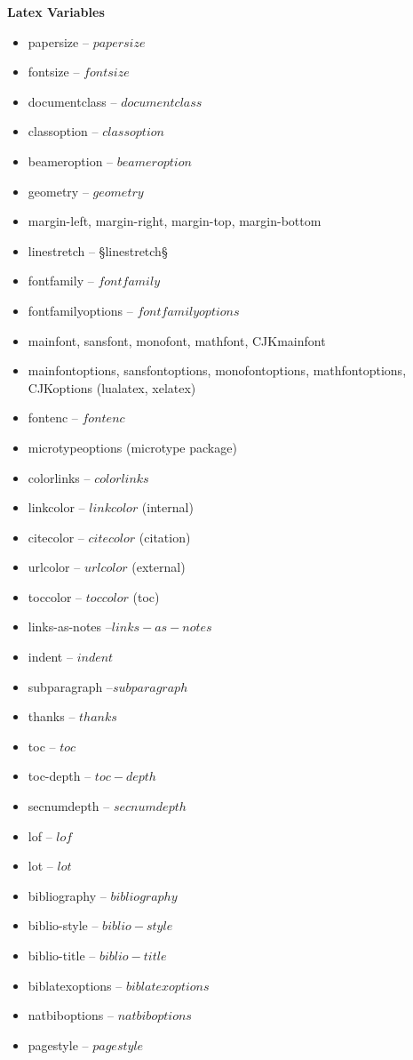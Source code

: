 \documentclass[$if(fontsize)$$fontsize$,$endif$$if(lang)$$babel-lang$,$endif$$if(papersize)$$papersize$paper,$endif$$for(classoption)$$classoption$$sep$,$endfor$]{$documentclass$}
\begin{document}
\textbf{Latex Variables}
\begin{itemize}
        \item papersize -- $papersize$
        \item fontsize -- $fontsize$
        \item documentclass -- $documentclass$
        \item classoption -- $classoption$
        \item beameroption -- $beameroption$
        \item geometry -- $geometry$
        \item margin-left, margin-right, margin-top, margin-bottom %
        \item linestretch -- §linestretch§
        \item fontfamily -- $fontfamily$
        \item fontfamilyoptions -- $fontfamilyoptions$
        \item mainfont, sansfont, monofont, mathfont, CJKmainfont
        \item mainfontoptions, sansfontoptions, monofontoptions, mathfontoptions, CJKoptions (lualatex, xelatex)
        \item fontenc -- $fontenc$
        \item microtypeoptions (microtype package)
        \item colorlinks -- $colorlinks$
        \item linkcolor -- $linkcolor$ (internal)
        \item citecolor -- $citecolor$ (citation)
        \item urlcolor -- $urlcolor$ (external)
        \item toccolor -- $toccolor$ (toc)
        \item links-as-notes --$links-as-notes$
        \item indent -- $indent$
        \item subparagraph --$subparagraph$
        \item thanks -- $thanks$
        \item toc -- $toc$
        \item toc-depth -- $toc-depth$
        \item secnumdepth -- $secnumdepth$
        \item lof -- $lof$
        \item lot -- $lot$
        \item bibliography -- $bibliography$
        \item biblio-style -- $biblio-style$
        \item biblio-title -- $biblio-title$
        \item biblatexoptions -- $biblatexoptions$
        \item natbiboptions -- $natbiboptions$
        \item pagestyle -- $pagestyle$
\end{itemize}
\end{document}
